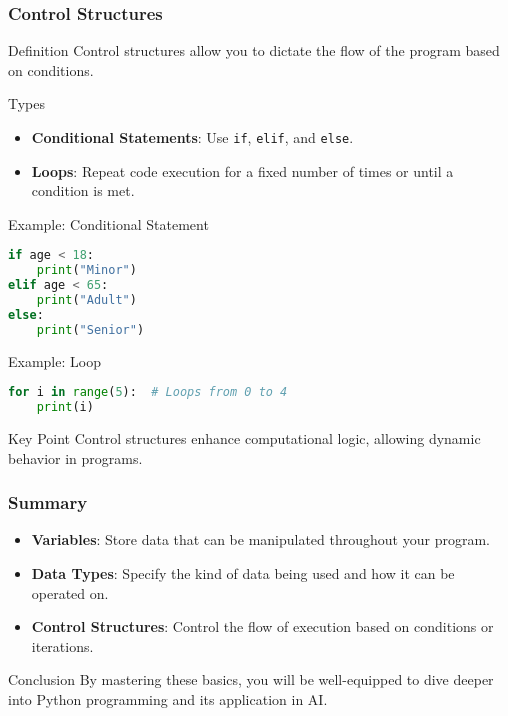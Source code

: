 \documentclass[aspectratio=169]{beamer}
\begin{document}
\begin{frame}[fragile]
    \frametitle{Control Structures}
    \begin{block}{Definition}
        Control structures allow you to dictate the flow of the program based on conditions.
    \end{block}
    \begin{block}{Types}
        \begin{itemize}
            \item \textbf{Conditional Statements}: Use \texttt{if}, \texttt{elif}, and \texttt{else}.
            \item \textbf{Loops}: Repeat code execution for a fixed number of times or until a condition is met.
        \end{itemize}
    \end{block}
    \begin{block}{Example: Conditional Statement}
        \begin{lstlisting}[language=python]
if age < 18:
    print("Minor")
elif age < 65:
    print("Adult")
else:
    print("Senior")
        \end{lstlisting}
    \end{block}
    \begin{block}{Example: Loop}
        \begin{lstlisting}[language=python]
for i in range(5):  # Loops from 0 to 4
    print(i)
        \end{lstlisting}
    \end{block}
    \begin{block}{Key Point}
        Control structures enhance computational logic, allowing dynamic behavior in programs.
    \end{block}
\end{frame}

\begin{frame}[fragile]
    \frametitle{Summary}
    \begin{itemize}
        \item \textbf{Variables}: Store data that can be manipulated throughout your program.
        \item \textbf{Data Types}: Specify the kind of data being used and how it can be operated on.
        \item \textbf{Control Structures}: Control the flow of execution based on conditions or iterations.
    \end{itemize}
    \begin{block}{Conclusion}
        By mastering these basics, you will be well-equipped to dive deeper into Python programming and its application in AI.
    \end{block}
\end{frame}
\end{document}
